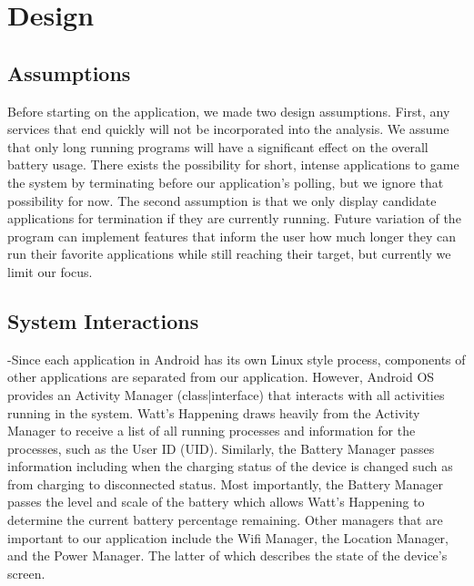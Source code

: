 \section*{Design}
\subsection*{Assumptions}
Before starting on the application, we made two design assumptions.  
First, any services that end quickly will not be incorporated into the analysis.  
We assume that only long running programs will have a significant effect on the overall battery usage.  
There exists the possibility for short, intense applications to game the system by terminating before our application's polling, but we ignore that possibility for now.  
The second assumption is that we only display candidate applications for termination if they are currently running.  
Future variation of the program can implement features that inform the user how much longer they can run their favorite applications while still reaching their target, but currently we limit our focus.

\subsection{System Interactions}
-Since each application in Android has its own Linux style process, components of other applications are separated from our application.  
However, Android OS provides an Activity Manager (class|interface) that interacts with all activities running in the system.  
Watt's Happening draws heavily from the Activity Manager to receive a list of all running processes and information for the processes, such as the User ID (UID).   
Similarly, the Battery Manager passes information including when the charging status of the 
device is changed such as from charging to disconnected status.  
Most importantly, the Battery Manager passes the level and scale of the battery which allows Watt's Happening to determine the current battery percentage remaining.  
Other managers that are important to our application include the Wifi Manager, the Location Manager, and the Power Manager.  
The latter of which describes the state of the device's screen. %
